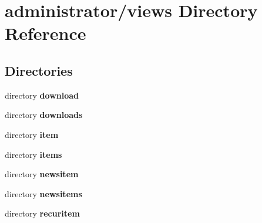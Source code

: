 \section{administrator/views Directory Reference}
\label{dir_3796deff8b970f3c7d91a4f543480a89}
\subsection*{Directories}
\begin{DoxyCompactItemize}
\item 
directory \textbf{ download}
\item 
directory \textbf{ downloads}
\item 
directory \textbf{ item}
\item 
directory \textbf{ items}
\item 
directory \textbf{ newsitem}
\item 
directory \textbf{ newsitems}
\item 
directory \textbf{ recuritem}
\end{DoxyCompactItemize}
